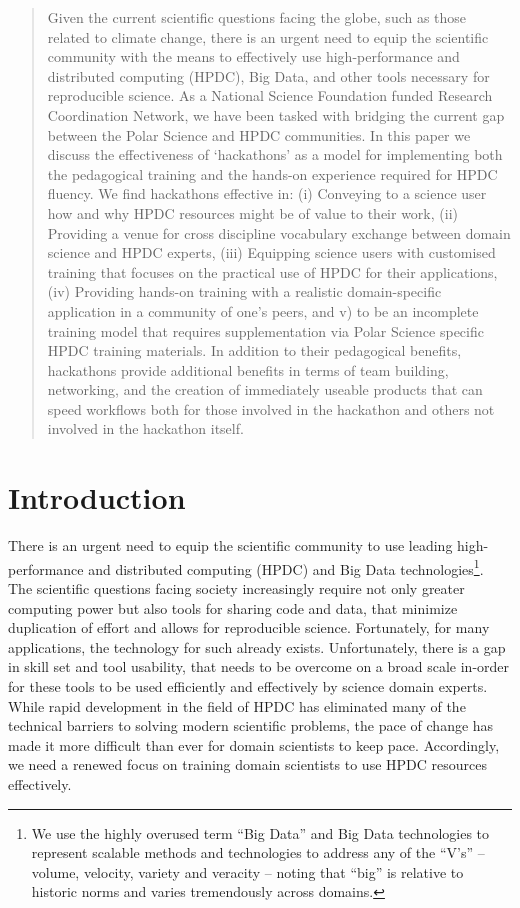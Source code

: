 \documentclass[conference]{IEEEtran}
\begin{document}
\begin{abstract}
Given the current scientific questions facing the globe, such as those related to climate change, there is an urgent need to equip the scientific community with the means to effectively use high-performance and distributed computing (HPDC), Big Data, and other tools necessary for reproducible science.  As a National Science Foundation funded Research Coordination Network, we have been tasked with bridging the current gap between the Polar Science and HPDC communities. In this paper we discuss the effectiveness of ‘hackathons’ as a model for implementing both the pedagogical training and the hands-on experience required for HPDC fluency.  We find hackathons effective in: (i) Conveying to a science user how and why HPDC resources might be of value to their work, (ii) Providing a venue for cross discipline vocabulary exchange between domain science and HPDC experts, (iii) Equipping science users with customised training that focuses on the practical use of HPDC for their applications, (iv) Providing hands-on training with a realistic domain-specific application in a community of one’s peers, and v) to be an incomplete training model that requires supplementation via Polar Science specific HPDC training materials. In addition to their pedagogical benefits, hackathons provide additional benefits in terms of team building, networking, and the creation of immediately useable products that can speed workflows both for those involved in the hackathon and others not involved in the hackathon itself. 
\end{abstract}


\section{Introduction}
There is an urgent need to equip the scientific community to use leading high-performance and distributed computing (HPDC) and Big Data technologies\footnote{ We use the highly overused term “Big Data” and Big Data technologies to represent scalable methods and technologies to address any of the “V’s”  -- volume, velocity, variety and veracity -- noting that “big” is relative to historic norms and varies tremendously across domains.}. The scientific questions facing society increasingly require not only greater computing power but also tools for sharing code and data, that minimize duplication of effort and allows for reproducible science. Fortunately, for many applications, the technology for such already exists. Unfortunately, there is a gap in skill set and tool usability, that needs to be overcome on a broad scale in-order for these tools to be used efficiently and effectively by science domain experts. While rapid development in the field of HPDC has eliminated many of the technical barriers to solving modern scientific problems, the pace of change has made it more difficult than ever for domain scientists to keep pace. Accordingly, we need a renewed focus on training domain scientists to use HPDC resources effectively. 
\end{document}
